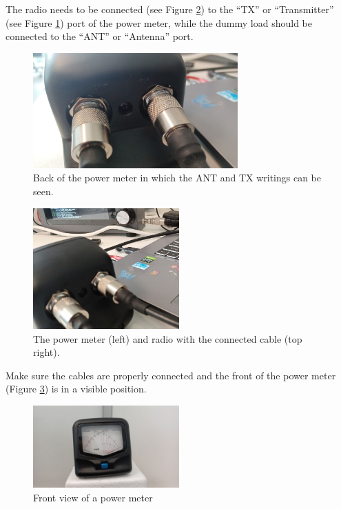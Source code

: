\documentclass[11pt,a4paper]{article}
\begin{document}
The radio needs to be connected (see Figure \ref{fig:backview4}) to the ``TX'' or ``Transmitter'' (see Figure \ref{fig:backview2}) port of the power meter, while the dummy load
should be connected to the ``ANT'' or ``Antenna'' port.

\begin{figure}[H]
  \centering
  \includegraphics[width=0.7\textwidth]{pictures/wattmeter_2.jpeg}
  \caption{Back of the power meter in which the ANT and TX writings can be seen.}
  \label{fig:backview2}
\end{figure}

\begin{figure}[H]
  \centering
  \includegraphics[width=0.5\textwidth]{pictures/wattmeter_4-edited.jpeg}
  \caption{The power meter (left) and radio with the connected cable (top right).}
  \label{fig:backview4}
\end{figure}

Make sure the cables are properly connected and the front of the power meter (Figure \ref{fig:frontview1})
is in a visible position.

\begin{figure}[H]
  \centering
  \includegraphics[width=0.5\textwidth]{pictures/wattmeter_5.jpeg}
  \caption{Front view of a power meter}
  \label{fig:frontview1}
\end{figure}
\end{document}
